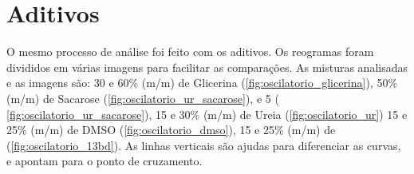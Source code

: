 	\FloatBarrier
	
	\section{Aditivos} 

	O mesmo processo de análise foi feito com os aditivos. Os reogramas foram divididos em várias imagens para facilitar as comparações. As misturas analisadas e as imagens são: 30 e 60\% (m/m) de Glicerina (\autoref{fig:oscilatorio_glicerina}), 50\% (m/m) de Sacarose (\autoref{fig:oscilatorio_ur_sacarose}), e 5 ( \autoref{fig:oscilatorio_ur_sacarose}), 15 e 30\% (m/m) de Ureia (\autoref{fig:oscilatorio_ur}) 15 e 25\% (m/m) de DMSO (\autoref{fig:oscilatorio_dmso}), 15 e 25\% (m/m) de \BD{} (\autoref{fig:oscilatorio_13bd}). As linhas verticais são ajudas para diferenciar as curvas, e apontam para o ponto de cruzamento.
	

